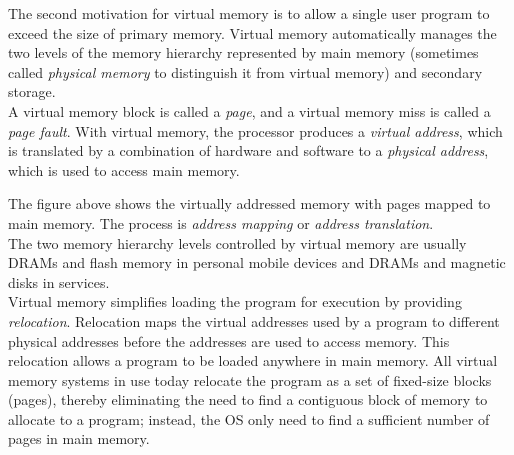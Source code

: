 \documentclass[12pt]{article}
\theoremstyle{definition}
\begin{document}
  The second motivation for virtual memory is to allow a single user program to exceed the size of primary memory.
  Virtual memory automatically manages the two levels of the memory hierarchy represented by main memory (sometimes called \emph{physical memory} to distinguish it from virtual memory) and secondary storage. \\

  A virtual memory block is called a \emph{page}, and a virtual memory miss is called a \emph{page fault}.
  With virtual memory, the processor produces a \emph{virtual address}, which is translated by a combination of hardware and software to a \emph{physical address}, which is used to access main memory.

  \begin{figure}[!htp]
  \end{figure}

  The figure above shows the virtually addressed memory with pages mapped to main memory.
  The process is \emph{address mapping} or \emph{address translation}. \\

  The two memory hierarchy levels controlled by virtual memory are usually DRAMs and flash memory in personal mobile devices and DRAMs and magnetic disks in services. \\

  Virtual memory simplifies loading the program for execution by providing \emph{relocation}.
  Relocation maps the virtual addresses used by a program to different physical addresses before the addresses are used to access memory.
  This relocation allows a program to be loaded anywhere in main memory.
  All virtual memory systems in use today relocate the program as a set of fixed-size blocks (pages), thereby eliminating the need to find a contiguous block of memory to allocate to a program;
  instead, the OS only need to find a sufficient number of pages in main memory. \\
\end{document}
